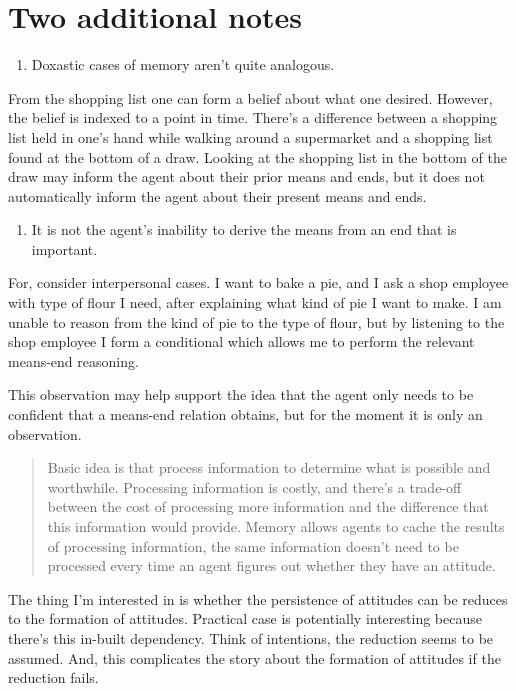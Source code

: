\documentclass[10pt]{article}
\begin{document}
\section{Two additional notes}
\label{sec:two-additional-notes}

\begin{enumerate}
\item Doxastic cases of memory aren't quite analogous.
\end{enumerate}

From the shopping list one can form a belief about what one desired.
However, the belief is indexed to a point in time.
There's a difference between a shopping list held in one's hand while walking around a supermarket and a shopping list found at the bottom of a draw.
Looking at the shopping list in the bottom of the draw may inform the agent about their prior means and ends, but it does not automatically inform the agent about their present means and ends.


\begin{enumerate}[resume]
\item It is not the agent's inability to derive the means from an end that is important.
\end{enumerate}
For, consider interpersonal cases.
I want to bake a pie, and I ask a shop employee with type of flour I need, after explaining what kind of pie I want to make.
I am unable to reason from the kind of pie to the type of flour, but by listening to the shop employee I form a conditional which allows me to perform the relevant means-end reasoning.

This observation may help support the idea that the agent only needs to be confident that a means-end relation obtains, but for the moment it is only an observation.

\newpage

\begin{quote}
  Basic idea is that process information to determine what is possible and worthwhile.
  Processing information is costly, and there's a trade-off between the cost of processing more information and the difference that this information would provide.
  Memory allows agents to cache the results of processing information, the same information doesn't need to be processed every time an agent figures out whether they have an attitude.
\end{quote}


\begin{note}
  The thing I'm interested in is whether the persistence of attitudes can be reduces to the formation of attitudes.
  Practical case is potentially interesting because there's this in-built dependency.
  Think of intentions, the reduction seems to be assumed.
  And, this complicates the story about the formation of attitudes if the reduction fails.
\end{note}
\end{document}
